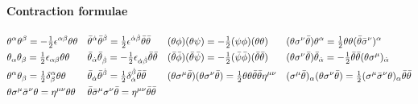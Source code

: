 \documentclass[CheatSheet]{subfiles}
\begin{document}
\paragraph{Contraction formulae}
\begin{align*}
&\theta^\alpha\theta^\beta=-\tfrac12\epsilon^{\alpha\beta}\theta\theta&
&\bar\theta^{\dot\alpha}\bar\theta^{\dot\beta}=\tfrac12\epsilon^{{\dot\alpha}{\dot\beta}}\bar\theta\bar\theta&
&(\theta\phi)(\theta\psi)=-\tfrac12(\psi\phi)(\theta\theta)&
&(\theta\sigma^\nu\bar\theta)\theta^\alpha = \tfrac12\theta\theta(\bar\theta\bar\sigma^\nu)^\alpha
\\
&\theta_\alpha\theta_\beta=\tfrac12\epsilon_{\alpha\beta}\theta\theta&
&\bar\theta_{\dot\alpha}\bar\theta_{\dot\beta}=-\tfrac12\epsilon_{{\dot\alpha}{\dot\beta}}\bar\theta\bar\theta&
&(\bar\theta\bar\phi)(\bar\theta\bar\psi)=-\tfrac12(\bar\psi\bar\phi)(\bar\theta\bar\theta)&
&(\theta\sigma^\nu\bar\theta)\bar\theta_{\dot\alpha}= -\tfrac12\bar\theta\bar\theta(\theta\sigma^\mu)_{\dot\alpha}
\\
&\theta^\alpha\theta_\beta=\tfrac12\delta^\alpha_\beta\theta\theta&
&\bar\theta_{\dot\alpha}\bar\theta^{\dot\beta}=\tfrac12\delta^{\dot\beta}_{\dot\alpha}\bar\theta\bar\theta&
&(\theta\sigma^\mu\bar\theta)(\theta\sigma^\nu\bar\theta)=\tfrac12\theta\theta\bar\theta\bar\theta\eta^{\mu\nu}&
& (\sigma^\mu\bar\theta)_\alpha(\theta\sigma^\nu\bar\theta) = \tfrac12(\sigma^\mu\bar\sigma^\nu\theta)_\alpha\bar\theta\bar\theta
\\
&\theta\sigma^\mu\bar\sigma^\nu\theta=\eta^{\mu\nu}\theta\theta&
&\bar\theta\bar\sigma^\mu\sigma^\nu\bar\theta=\eta^{\mu\nu}\bar\theta\bar\theta&
\end{align*}\vspace{-9pt}
\end{document}
